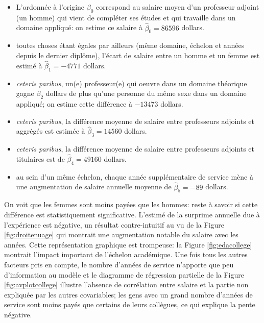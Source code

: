 \documentclass[
  11pt,
  letterpaper,
]{article}
\providecommand{\tightlist}{%
  \setlength{\itemsep}{0pt}\setlength{\parskip}{0pt}}
\theoremstyle{definition}
\theoremstyle{definition}
\theoremstyle{definition}
\theoremstyle{remark}
\begin{document}
\begin{itemize}
\tightlist
\item
  L'ordonnée à l'origine \(\beta_0\) correspond au salaire moyen d'un professeur adjoint (un homme) qui vient de compléter ses études et qui travaille dans un domaine appliqué: on estime ce salaire à \(\widehat{\beta}_0=86596\) dollars.
\item
  toutes choses étant égales par ailleurs (même domaine, échelon et années depuis le dernier diplôme), l'écart de salaire entre un homme et un femme est estimé à \(\widehat{\beta}_1=-4771\) dollars.
\item
  \emph{ceteris paribus}, un(e) professeur(e) qui oeuvre dans un domaine théorique gagne \(\beta_2\) dollars de plus qu'une personne du même sexe dans un domaine appliqué; on estime cette différence à \(-13473\) dollars.
\item
  \emph{ceteris paribus}, la différence moyenne de salaire entre professeurs adjoints et aggrégés est estimée à \(\widehat{\beta}_3=14560\) dollars.
\item
  \emph{ceteris paribus}, la différence moyenne de salaire entre professeurs adjoints et titulaires est de \(\widehat{\beta}_4=49160\) dollars.
\item
  au sein d'un même échelon, chaque année supplémentaire de service mène à une augmentation de salaire annuelle moyenne de \(\widehat{\beta}_5=-89\) dollars.
\end{itemize}

On voit que les femmes sont moins payées que les hommes: reste à savoir si cette différence est statistiquement significative. L'estimé de la surprime annuelle due à l'expérience est négative, un résultat contre-intuitif au vu de la Figure \ref{fig:droitenuage} qui montrait une augmentation notable du salaire avec les années. Cette représentation graphique est trompeuse: la Figure \ref{fig:edacollege} montrait l'impact important de l'échelon académique. Une fois tous les autres facteurs pris en compte, le nombre d'années de service n'apporte que peu d'information au modèle et le diagramme de régression partielle de la Figure \ref{fig:avplotcollege} illustre l'absence de corrélation entre salaire et la partie non expliquée par les autres covariables; les gens avec un grand nombre d'années de service sont moins payés que certains de leurs collègues, ce qui explique la pente négative.
\end{document}
